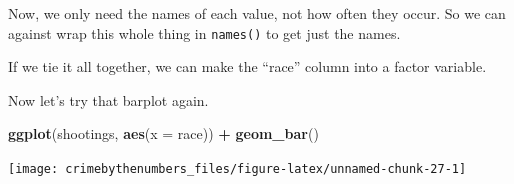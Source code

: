 \documentclass[
  12pt,
]{book}
\newenvironment{Shaded}{\begin{snugshade}}{\end{snugshade}}
\newcommand{\CommentTok}[1]{\textcolor[rgb]{0.37,0.37,0.37}{\textit{#1}}}
\newcommand{\DataTypeTok}[1]{\textcolor[rgb]{0.27,0.27,0.27}{#1}}
\newcommand{\KeywordTok}[1]{\textcolor[rgb]{0.27,0.27,0.27}{\textbf{#1}}}
\newcommand{\NormalTok}[1]{#1}
\newcommand{\OperatorTok}[1]{\textcolor[rgb]{0.43,0.43,0.43}{\textbf{#1}}}
\newcommand{\OtherTok}[1]{\textcolor[rgb]{0.37,0.37,0.37}{#1}}
\newcommand{\StringTok}[1]{\textcolor[rgb]{0.5,0.5,0.5}{#1}}
\begin{document}
\begin{Shaded}
\end{Shaded}

Now, we only need the names of each value, not how often they occur. So we can against wrap this whole thing in \texttt{names()} to get just the names.

\begin{Shaded}
\end{Shaded}

If we tie it all together, we can make the ``race'' column into a factor variable.

\begin{Shaded}
\end{Shaded}

Now let's try that barplot again.

\begin{Shaded}
\begin{Highlighting}[]
\KeywordTok{ggplot}\NormalTok{(shootings, }\KeywordTok{aes}\NormalTok{(}\DataTypeTok{x =}\NormalTok{ race)) }\OperatorTok{+}\StringTok{ }
\StringTok{  }\KeywordTok{geom\_bar}\NormalTok{() }
\end{Highlighting}
\end{Shaded}

\begin{center}\texttt{[image: crimebythenumbers\_files/figure-latex/unnamed-chunk-27-1]} \end{center}
\end{document}
